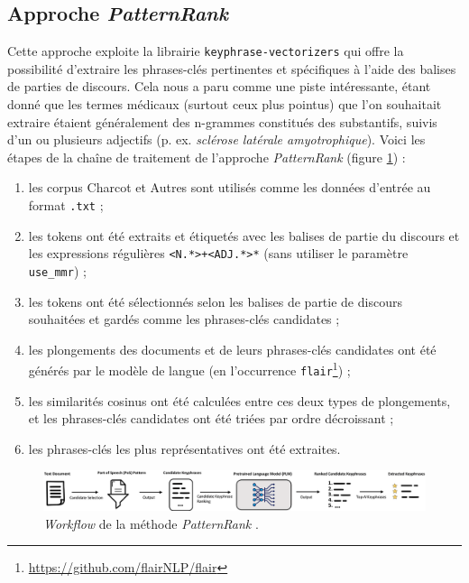 \subsection{Approche \textit{PatternRank}}
\label{patternrank}
Cette approche exploite la librairie \texttt{keyphrase-vectorizers} qui offre la possibilité d'extraire les phrases-clés pertinentes et spécifiques à l'aide des balises de parties de discours. Cela nous a paru comme une piste intéressante, étant donné que les termes médicaux (surtout ceux plus pointus) que l'on souhaitait extraire étaient généralement des n-grammes constitués des substantifs, suivis d'un ou plusieurs adjectifs (p. ex. \textit{sclérose latérale amyotrophique}). Voici les étapes de la chaîne de traitement de l'approche \textit{PatternRank} (figure \ref{fig:patternrank}) :
\begin{enumerate}
\item les corpus \og Charcot \fg{} et \og Autres \fg{} sont utilisés comme les données d'entrée au format \texttt{.txt} ;
\item les tokens ont été extraits et étiquetés avec les balises de partie du discours et les expressions régulières \texttt{<N.*>+<ADJ.*>*} (sans utiliser le paramètre \texttt{use\_mmr}) ;
\item les tokens ont été sélectionnés selon les balises de partie de discours souhaitées et gardés comme les phrases-clés candidates ;
\item les plongements des documents et de leurs phrases-clés candidates ont été générés par le modèle de langue (en l'occurrence \texttt{flair}\footnote{\url{https://github.com/flairNLP/flair}}) ;
\item les similarités cosinus ont été calculées entre ces deux types de plongements, et les phrases-clés candidates ont été triées par ordre décroissant ;
\item les phrases-clés les plus représentatives ont été extraites.
\end{enumerate}

\begin{figure}[!h]
    \centering
    \includegraphics[width=1\textwidth]{img/patternrank_workflow.png}
    \caption{\textit{Workflow} de la méthode \textit{PatternRank} \citep[p.~2]{schopf2022}.}
    \label{fig:patternrank}
\end{figure}

